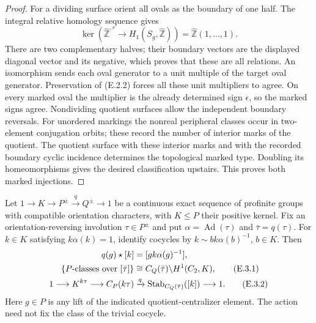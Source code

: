 \begin{proof}
For a dividing surface orient all ovals as the boundary of
one half.  The integral relative homology sequence gives
\[
 \ker\left(\widehat{\mathbb Z}^{,r}
       \longrightarrow H_1(S_g,\widehat{\mathbb Z})\right)
       =\widehat{\mathbb Z}(1,\ldots,1).                     \tag{E.2.2}
\]
There are two complementary halves; their boundary vectors
are the displayed diagonal vector and its negative, which
proves that these are all relations.  An isomorphism sends
each oval generator to a unit multiple of the target oval
generator.  Preservation of (E.2.2) forces all these unit
multipliers to agree.  On every marked oval the multiplier is
the already determined sign $\epsilon$, so the marked signs
agree.  Nondividing quotient surfaces allow the independent
boundary reversals.  For unordered markings the nonreal
peripheral classes occur in two-element conjugation orbits;
these record the number of interior marks of the quotient.
The quotient surface with these interior marks and with the
recorded boundary cyclic incidence determines the topological
marked type.  Doubling its homeomorphisms gives the desired
classification upstairs.  This proves both marked injections.
\end{proof}

Let $1\to K\to P^{\pm}\xrightarrow{q}Q^{\pm}\to1$ be a
continuous exact sequence of profinite groups with compatible
orientation characters, with $K\leq P$ their positive kernel.
Fix an orientation-reversing involution $\tau\in P^{\pm}$ and
put $\alpha=\operatorname{Ad}(\tau)$ and $\bar\tau=q(\tau)$.
For $k\in K$ satisfying $k\alpha(k)=1$, identify cocycles by
$k\sim b k\alpha(b)^{-1}$, $b\in K$.  Then
\begin{align}
 q(g)\star[k]&=[gk\alpha(g)^{-1}],\notag\\
 \{\text{$P$-classes over }[\bar\tau]\}
      &\cong C_Q(\bar\tau)\backslash H^1(C_2,K),             \tag{E.3.1}\\
 1\longrightarrow K^{k\tau}\longrightarrow C_P(k\tau)
      &\xrightarrow{q}
       \operatorname{Stab}_{C_Q(\bar\tau)}([k])
       \longrightarrow1 .                                  \tag{E.3.2}
\end{align}
Here $g\in P$ is any lift of the indicated quotient-centralizer
element.  The action need not fix the class of the trivial cocycle.

